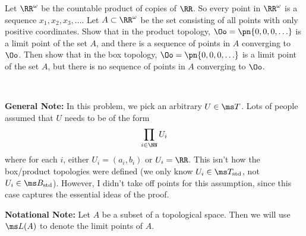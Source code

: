 \documentclass{fkpset}
\newenvironment{why}{\begin{adjustwidth}{0.01\linewidth}{0.05\linewidth}~}%
  {\end{adjustwidth}}
\begin{document}
  \begin{problem}[4.41]
    Let $\RR^\omega$ be the countable product of copies of $\RR$. So
    every point in $\RR^\omega$ is a sequence $x_1, x_2, x_3, \ldots$.
    Let $A \subset \RR^\omega$ be the set consisting of all points
    with only positive coordinates. Show that in the product topology,
    $\Oo = \pn{0,0,0,\ldots}$ is a limit point of the set $A$, and
    there is a sequence of points in $A$ converging to $\Oo$. Then
    show that in the box topology, $\Oo = \pn{0,0,0,\ldots}$ is a
    limit point of the set $A$, but there is no sequence of points in
    $A$ converging to $\Oo$.
  \end{problem}
  \begin{why}
    \begin{leftbar}
      \textbf{General Note:} In this problem, we pick an arbitrary $U
      \in \ms T$. Lots of people assumed that $U$ needs to be of the
      form
      \[
        \prod_{i \in \NN} U_i
      \]
      where for each $i$, either $U_i = (a_i, b_i)$ or $U_i = \RR$.
      This isn't how the box/product topologies were defined (we only
      know $U_i \in \ms T_{\rm std}$, not $U_i \in \ms B_{\rm std}$).
      However, I didn't take off points for this assumption, since
      this case captures the essential ideas of the proof.
    \end{leftbar}
    \begin{leftbar}
      \textbf{Notational Note:} Let $A$ be a subset of a topological
      space. Then we will use $\ms L(A)$ to denote the limit points of
      $A$.
    \end{leftbar}
  \end{why}
\end{document}
